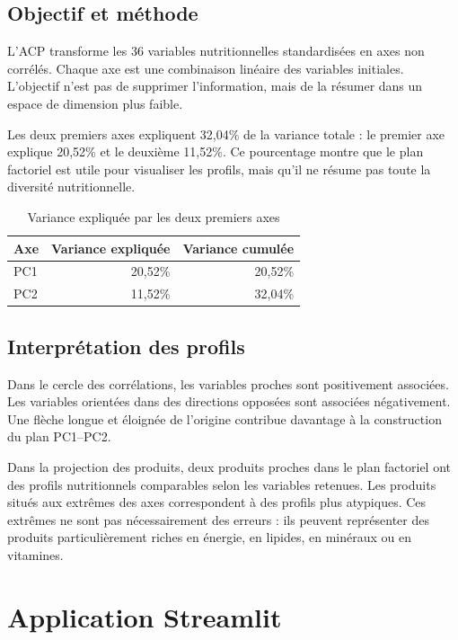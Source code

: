 \documentclass[12pt,a4paper]{article}
\begin{document}
\subsection{Objectif et méthode}

L'ACP transforme les 36 variables nutritionnelles standardisées en axes non corrélés. Chaque axe est une combinaison linéaire des variables initiales. L'objectif n'est pas de supprimer l'information, mais de la résumer dans un espace de dimension plus faible.

Les deux premiers axes expliquent 32,04\% de la variance totale : le premier axe explique 20,52\% et le deuxième 11,52\%. Ce pourcentage montre que le plan factoriel est utile pour visualiser les profils, mais qu'il ne résume pas toute la diversité nutritionnelle.

\begin{table}[H]
\centering
\caption{Variance expliquée par les deux premiers axes}
\label{tab:pca}
\begin{tabular}{lrr}
\toprule
Axe & Variance expliquée & Variance cumulée \\
\midrule
PC1 & 20,52\% & 20,52\% \\
PC2 & 11,52\% & 32,04\% \\
\bottomrule
\end{tabular}
\end{table}

\subsection{Interprétation des profils}

Dans le cercle des corrélations, les variables proches sont positivement associées. Les variables orientées dans des directions opposées sont associées négativement. Une flèche longue et éloignée de l'origine contribue davantage à la construction du plan PC1--PC2.

Dans la projection des produits, deux produits proches dans le plan factoriel ont des profils nutritionnels comparables selon les variables retenues. Les produits situés aux extrêmes des axes correspondent à des profils plus atypiques. Ces extrêmes ne sont pas nécessairement des erreurs : ils peuvent représenter des produits particulièrement riches en énergie, en lipides, en minéraux ou en vitamines.

\section{Application Streamlit}
\end{document}
